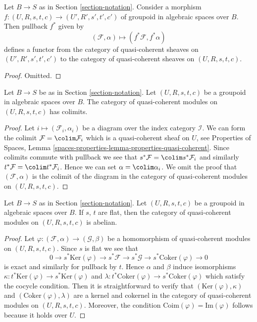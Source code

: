 \begin{lemma}
\label{lemma-pullback}
Let $B \to S$ as in Section \ref{section-notation}.
Consider a morphism
$f : (U, R, s, t, c) \to (U', R', s', t', c')$
of groupoid in algebraic spaces over $B$. Then pullback $f^*$ given by
$$
(\mathcal{F}, \alpha) \mapsto (f^*\mathcal{F}, f^*\alpha)
$$
defines a functor from the category of quasi-coherent sheaves on
$(U', R', s', t', c')$ to the category of quasi-coherent sheaves on
$(U, R, s, t, c)$.
\end{lemma}

\begin{proof}
Omitted.
\end{proof}

\begin{lemma}
\label{lemma-colimits}
Let $B \to S$ be as in Section \ref{section-notation}.
Let $(U, R, s, t, c)$ be a groupoid in algebraic spaces over $B$.
The category of quasi-coherent modules on $(U, R, s, t, c)$ has colimits.
\end{lemma}

\begin{proof}
Let $i \mapsto (\mathcal{F}_i, \alpha_i)$ be a diagram over the index
category $\mathcal{I}$. We can form the colimit
$\mathcal{F} = \colim \mathcal{F}_i$
which is a quasi-coherent sheaf on $U$, see
Properties of Spaces, Lemma
\ref{spaces-properties-lemma-properties-quasi-coherent}.
Since colimits commute with pullback we see that
$s^*\mathcal{F} = \colim s^*\mathcal{F}_i$ and similarly
$t^*\mathcal{F} = \colim t^*\mathcal{F}_i$. Hence we can set
$\alpha = \colim \alpha_i$. We omit the proof that $(\mathcal{F}, \alpha)$
is the colimit of the diagram in the category of quasi-coherent modules
on $(U, R, s, t, c)$.
\end{proof}

\begin{lemma}
\label{lemma-abelian}
Let $B \to S$ as in Section \ref{section-notation}.
Let $(U, R, s, t, c)$ be a groupoid in algebraic spaces over $B$.
If $s$, $t$ are flat, then the category of quasi-coherent modules on
$(U, R, s, t, c)$ is abelian.
\end{lemma}

\begin{proof}
Let $\varphi : (\mathcal{F}, \alpha) \to (\mathcal{G}, \beta)$ be a
homomorphism of quasi-coherent modules on $(U, R, s, t, c)$. Since $s$ is flat
we see that
$$
0 \to s^*\text{Ker}(\varphi)
\to s^*\mathcal{F} \to s^*\mathcal{G} \to s^*\text{Coker}(\varphi) \to 0
$$
is exact and similarly for pullback by $t$. Hence $\alpha$ and $\beta$
induce isomorphisms
$\kappa : t^*\text{Ker}(\varphi) \to s^*\text{Ker}(\varphi)$ and
$\lambda : t^*\text{Coker}(\varphi) \to s^*\text{Coker}(\varphi)$
which satisfy the cocycle condition. Then it is straightforward to
verify that $(\text{Ker}(\varphi), \kappa)$ and
$(\text{Coker}(\varphi), \lambda)$ are a kernel and cokernel in the
category of quasi-coherent modules on $(U, R, s, t, c)$. Moreover,
the condition $\text{Coim}(\varphi) = \text{Im}(\varphi)$ follows
because it holds over $U$.
\end{proof}





